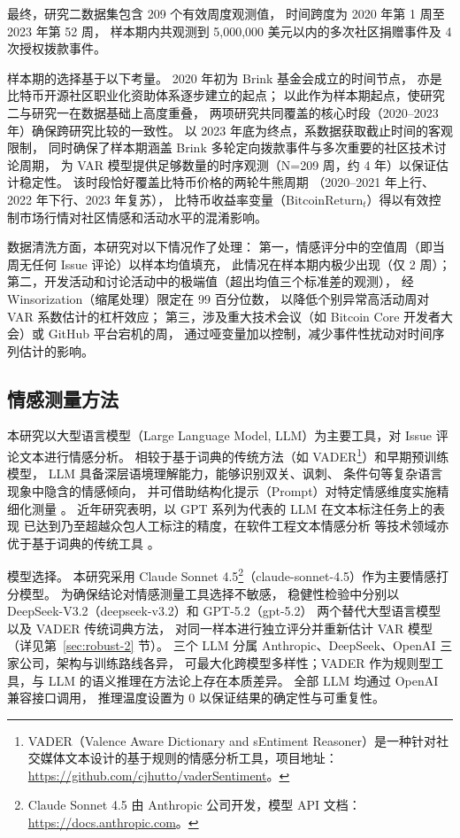 最终，研究二数据集包含 209 个有效周度观测值，
时间跨度为 2020 年第 1 周至 2023 年第 52 周，
样本期内共观测到 5,000,000 美元以内的多次社区捐赠事件及 4 次授权拨款事件。

样本期的选择基于以下考量。
2020 年初为 Brink 基金会成立的时间节点，
亦是比特币开源社区职业化资助体系逐步建立的起点；
以此作为样本期起点，使研究二与研究一在数据基础上高度重叠，
两项研究共同覆盖的核心时段（2020--2023 年）确保跨研究比较的一致性。
以 2023 年底为终点，系数据获取截止时间的客观限制，
同时确保了样本期涵盖 Brink 多轮定向拨款事件与多次重要的社区技术讨论周期，
为 VAR 模型提供足够数量的时序观测（N=209 周，约 4 年）以保证估计稳定性。
该时段恰好覆盖比特币价格的两轮牛熊周期
（2020--2021 年上行、2022 年下行、2023 年复苏），
比特币收益率变量（$\text{BitcoinReturn}_t$）得以有效控制市场行情对社区情感和活动水平的混淆影响。

数据清洗方面，本研究对以下情况作了处理：
第一，情感评分中的空值周（即当周无任何 Issue 评论）以样本均值填充，
此情况在样本期内极少出现（仅 2 周）；
第二，开发活动和讨论活动中的极端值（超出均值三个标准差的观测），
经 Winsorization（缩尾处理）限定在 99 百分位数，
以降低个别异常高活动周对 VAR 系数估计的杠杆效应；
第三，涉及重大技术会议（如 Bitcoin Core 开发者大会）或 GitHub 平台宕机的周，
通过哑变量加以控制，减少事件性扰动对时间序列估计的影响。

\subsection{情感测量方法}

本研究以大型语言模型（Large Language Model, LLM）为主要工具，对 Issue 评论文本进行情感分析。
相较于基于词典的传统方法（如 VADER\footnote{VADER（Valence Aware Dictionary and sEntiment Reasoner）是一种针对社交媒体文本设计的基于规则的情感分析工具，项目地址：\url{https://github.com/cjhutto/vaderSentiment}。}）和早期预训练模型，
LLM 具备深层语境理解能力，能够识别双关、讽刺、
条件句等复杂语言现象中隐含的情感倾向，
并可借助结构化提示（Prompt）对特定情感维度实施精细化测量
\cite{gilardi2023chatgpt}。
近年研究表明，以 GPT 系列为代表的 LLM 在文本标注任务上的表现
已达到乃至超越众包人工标注的精度，在软件工程文本情感分析
等技术领域亦优于基于词典的传统工具
\cite{zhang2020sentiment}。

模型选择。
本研究采用 Claude Sonnet 4.5\footnote{Claude Sonnet 4.5 由 Anthropic 公司开发，模型 API 文档：\url{https://docs.anthropic.com}。}（claude-sonnet-4.5）作为主要情感打分模型。
为确保结论对情感测量工具选择不敏感，
稳健性检验中分别以 DeepSeek-V3.2（deepseek-v3.2）和 GPT-5.2（gpt-5.2）
两个替代大型语言模型以及 VADER 传统词典方法，
对同一样本进行独立评分并重新估计 VAR 模型（详见第~\ref{sec:robust-2} 节）。
三个 LLM 分属 Anthropic、DeepSeek、OpenAI 三家公司，架构与训练路线各异，
可最大化跨模型多样性；VADER 作为规则型工具，与 LLM 的语义推理在方法论上存在本质差异。
全部 LLM 均通过 OpenAI 兼容接口调用，
推理温度设置为 0 以保证结果的确定性与可重复性。

